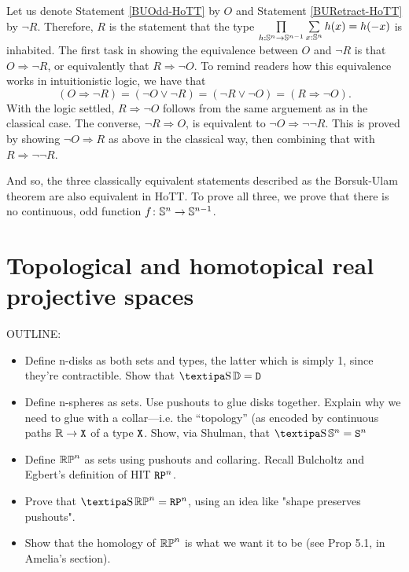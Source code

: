\documentclass{amsart}
\begin{document}
Let us denote Statement \ref{BUOdd-HoTT} by $O$ and Statement
\ref{BURetract-HoTT} by $\neg R$. Therefore, $R$ is the statement that
the type
$\prod\limits_{h:\mathbb{S}^n \rightarrow \mathbb{S}^{n-1}} \sum\limits_{x : \mathbb{S}^n}
h(x) = h(-x)$ is inhabited. The first task in showing the equivalence
between $O$ and $\neg R$ is that $O \Rightarrow \neg R $, or
equivalently that $R \Rightarrow \neg O$. To remind readers how this
equivalence works in intuitionistic logic, we have that
\[
  (O \Rightarrow \neg R)
  = (\neg O \lor \neg R)
  = (\neg R \lor \neg O)
  = (R \Rightarrow \neg O).
\]
With the logic settled, $R \Rightarrow \neg O$ follows from the same
arguement as in the classical case.  The converse,
$\neg R \Rightarrow O$, is equivalent to
$\neg O \Rightarrow \neg\neg R$. This is proved by showing
$\neg O \Rightarrow R$ as above in the classical way, then combining
that with $R \Rightarrow \neg\neg R$.

And so, the three classically equivalent statements described as the
Borsuk-Ulam theorem are also equivalent in HoTT. To prove all three, we prove that there is no continuous, odd function $f \colon \mathbb{S}^n \to \mathbb{S}^{n-1}$.

\section{Topological and homotopical real projective spaces}
\label{sec:rpn}

OUTLINE:
\begin{itemize}
\item
  Define n-disks as both sets and types, the latter which is
  simply 1, since they're contractible. Show that $ \shape
  \DD = \D $ 
\item
  Define n-spheres as sets.  Use pushouts to glue
  disks together. Explain why we need to glue with a
  collar---i.e. the ``topology'' (as encoded by continuous
  paths $ \mathbb{R} \to \mathtt{X} $ of a type $ \mathtt{X} $. Show, via Shulman,
  that $ \shape \SS^n = \S^n $ 
\item
  Define $ \mathbb{RP}^n $ as sets using pushouts and collaring.
  Recall Bulcholtz and Egbert's definition of HIT $ \mathtt{RP}^n
  $. 
 \item
  Prove that $ \shape \set{RP}^n = \RP^n $, using an idea like "shape preserves pushouts".
\item
Show that the homology of $\mathbb{RP}^n$ is what we want it to be (see Prop 5.1, in Amelia's section).
\end{itemize}
\end{document}
